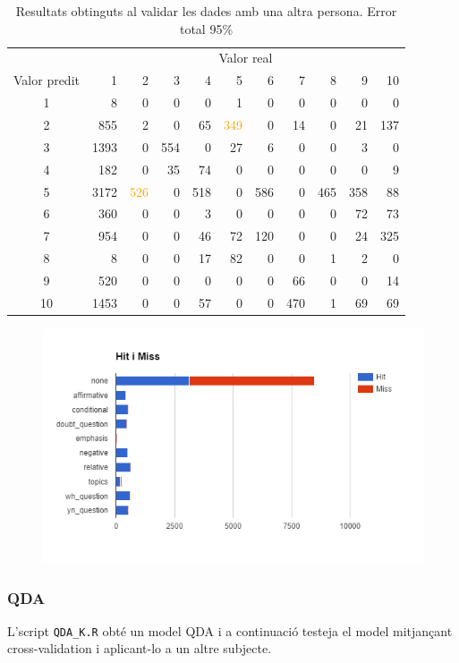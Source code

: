 \documentclass[a4paper]{article}
\begin{document}
\begin{table}[H]
	\centering
	\def\arraystretch{1.2}
	\begin{tabular}{|c|rrrrrrrrrr|}
		\hline
		& \multicolumn{10}{c|}{Valor real} \\
		Valor predit & 1 & 2 & 3 & 4 & 5 & 6 & 7 & 8 & 9 & 10 \\
		\hline
		1 & 8 & 0 & 0 & 0 & 1 & 0 & 0 & 0 & 0 & 0\\
		2 & 855 & 2 & 0 & 65 & \textcolor{Orange}{349} & 0 & 14 & 0 & 21 & 137\\
		3 & 1393 & 0 & 554 & 0 & 27 & 6 & 0 & 0 & 3 & 0\\
		4 & 182 & 0 & 35 & 74 & 0 & 0 & 0 & 0 & 0 & 9\\
		5 & 3172 & \textcolor{Orange}{526} & 0 & 518 & 0 & 586 & 0 & 465 & 358 & 88\\
		6 & 360 & 0 & 0 & 3 & 0 & 0 & 0 & 0 & 72 & 73\\
		7 & 954 & 0 & 0 & 46 & 72 & 120 & 0 & 0 & 24 & 325\\
		8 & 8 & 0 & 0 & 17 & 82 & 0 & 0 & 1 & 2 & 0\\
		9 & 520 & 0 & 0 & 0 & 0 & 0 & 66 & 0 & 0 & 14\\
		10 & 1453 & 0 & 0 & 57 & 0 & 0 & 470 & 1 & 69 & 69\\
		\hline
	\end{tabular}
	\caption{Resultats obtinguts al validar les dades amb una altra persona. Error total 95\%}
\end{table}

\begin{figure}[H]
	\centering
	\includegraphics[width=\textwidth]{images/image01}
\end{figure}

\subsubsection{QDA}
L’script \verb|QDA_K.R|  obté un model QDA i a continuació testeja el model mitjançant cross-validation i aplicant-lo a un altre subjecte.
\end{document}

